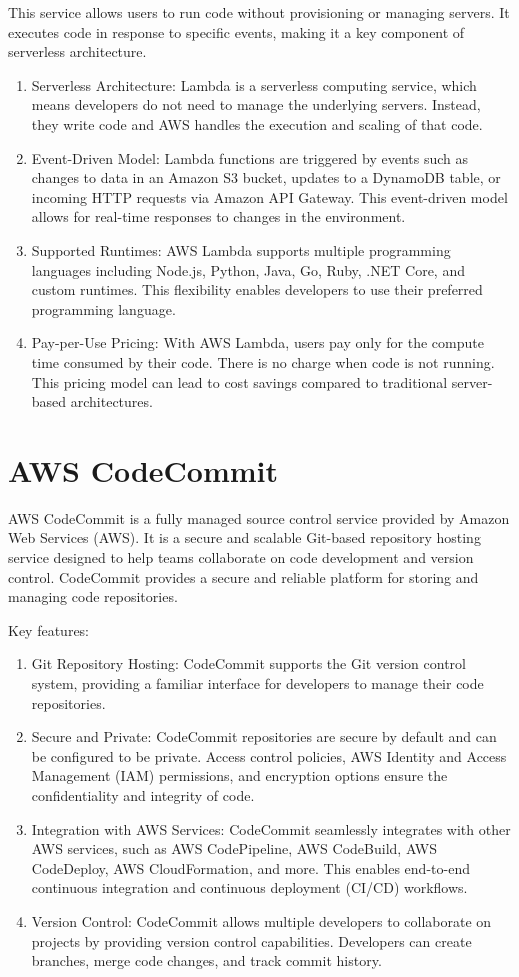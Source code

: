 \documentclass[11pt,a4paper,oneside]{report}
\begin{document}
This service allows users to run code without provisioning or managing servers. It executes code in response to specific events, making it a key component of serverless architecture.
\begin{enumerate}
  \item Serverless Architecture: Lambda is a serverless computing service, which means developers do not need to manage the underlying servers. Instead, they write code and AWS handles the execution and scaling of that code.
  \item Event-Driven Model: Lambda functions are triggered by events such as changes to data in an Amazon S3 bucket, updates to a DynamoDB table, or incoming HTTP requests via Amazon API Gateway. This event-driven model allows for real-time responses to changes in the environment.
  \item Supported Runtimes: AWS Lambda supports multiple programming languages including Node.js, Python, Java, Go, Ruby, .NET Core, and custom runtimes.
        This flexibility enables developers to use their preferred programming language.
  \item Pay-per-Use Pricing: With AWS Lambda, users pay only for the compute time consumed by their code. There is no charge when code is not running. This pricing model can lead to cost savings compared to traditional server-based architectures.
\end{enumerate}

\section{AWS CodeCommit}
AWS CodeCommit is a fully managed source control service provided by Amazon Web Services (AWS). It is a secure and scalable Git-based repository hosting service designed to help teams collaborate on code development and version control. CodeCommit provides a secure and reliable platform for storing and managing code repositories.

Key features:
\begin{enumerate}
  \item Git Repository Hosting: CodeCommit supports the Git version control system, providing a familiar interface for developers to manage their code repositories.
  \item Secure and Private: CodeCommit repositories are secure by default and can be configured to be private. Access control policies, AWS Identity and Access Management (IAM) permissions, and encryption options ensure the confidentiality and integrity of code.
  \item Integration with AWS Services: CodeCommit seamlessly integrates with other AWS services, such as AWS CodePipeline, AWS CodeBuild, AWS CodeDeploy, AWS CloudFormation, and more. This enables end-to-end continuous integration and continuous deployment (CI/CD) workflows.
  \item Version Control: CodeCommit allows multiple developers to collaborate on projects by providing version control capabilities. Developers can create branches, merge code changes, and track commit history.
\end{enumerate}
\end{document}
